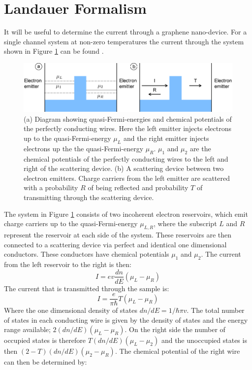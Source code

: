 		\section{Landauer Formalism}
		\label{Introduction - Landauer Formalism}
			It will be useful to determine the current through a graphene nano-device. For a single channel system at non-zero temperatures the current  through the system shown in Figure \ref{introduction-current} can be found \cite{b6}.
			\begin{figure}[h]
				\centerline{\includegraphics[scale=0.5]{images/current}}
				\caption{(a) Diagram showing quasi-Fermi-energies and chemical potentials of the perfectly conducting wires. Here the left emitter injects electrons up to the quasi-Fermi-energy $\mu_{L}$ and the right emitter injects electrons up the the quasi-Fermi-energy $\mu_{R}$. $\mu_{1}$ and $\mu_{2}$ are the chemical potentials of the perfectly conducting wires to the left and right of the scattering device. (b) A scattering device between two electron emitters. Charge carriers from the left emitter are scattered with a probability $R$ of being reflected and probability $T$ of transmitting through the scattering device.}
				\label{introduction-current}
			\end{figure}
			 The system in Figure \ref{introduction-current} consists of two incoherent electron reservoirs, which emit charge carriers up to the quasi-Fermi-energy $\mu_{L,R}$, where the subscript $L$ and $R$ represent the reservoir at each side of the system. These reservoirs are then connected to a scattering device via perfect and identical one dimensional conductors. These conductors have chemical potentials $\mu_{1}$ and $\mu_{2}$. The current from the left reservoir to the right is then:
			\begin{equation}
				I=ev\frac{dn}{dE}\left(\mu_{L}-\mu_{R}\right)
				\label{current-dos}
			\end{equation}
			The current that is transmitted through the sample is:
			\begin{equation}
				I=\frac{e}{\pi\hbar}T\left(\mu_{L}-\mu_{R}\right)
				\label{current-transmit}
			\end{equation}
			Where the one dimensional density of states $dn/dE=1/\hbar\pi v$. The total number of states in each conducting wire is given by the density of states and the energy range available; $2\left(dn/dE\right)\left(\mu_{L}-\mu_{R}\right)$. On the right side the number of occupied states is therefore $T\left(dn/dE\right)\left(\mu_{L}-\mu_{2}\right)$ and the unoccupied states is then $\left(2-T\right)\left(dn/dE\right)\left(\mu_{2}-\mu_{R}\right)$. The chemical potential of the right wire can then be determined by:
